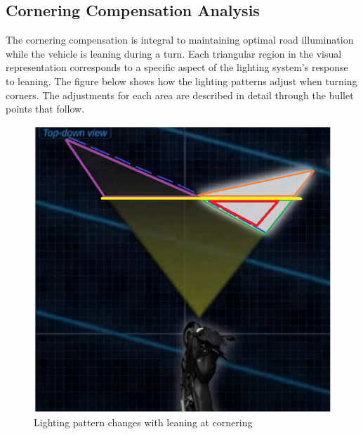 \subsection{Cornering Compensation Analysis}
The cornering compensation is integral to maintaining optimal road illumination while
the vehicle is leaning during a turn. Each triangular region in the visual representation
corresponds to a specific aspect of the lighting system's response to leaning.
The figure below shows how the lighting patterns adjust when turning corners. The
adjustments for each area are described in detail through the bullet points that follow.
\begin{figure}[h!]
    \centering
    \includegraphics[width=0.75\linewidth]{Grafik/Cornering_Analysis_2.png}
    \caption{Lighting pattern changes with leaning at cornering}
    \label{cornering}
\end{figure}
